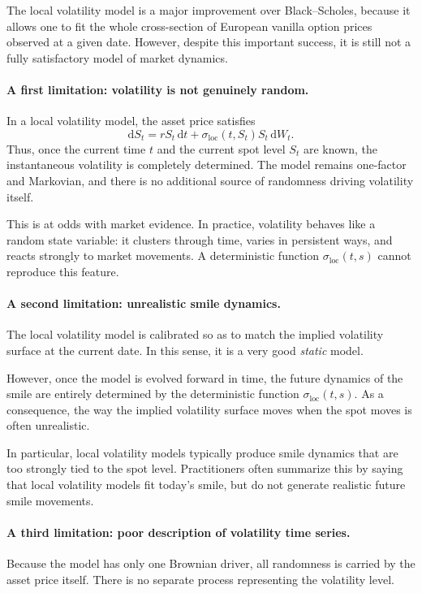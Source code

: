 \documentclass[11pt]{article}
\theoremstyle{plain}
\theoremstyle{definition}
\theoremstyle{remark}
\begin{document}
The local volatility model is a major improvement over Black--Scholes,
because it allows one to fit the whole cross-section of European vanilla
option prices observed at a given date.
However, despite this important success, it is still not a fully
satisfactory model of market dynamics.

\paragraph{A first limitation: volatility is not genuinely random.}
In a local volatility model, the asset price satisfies
\[
\mathrm{d}S_t
=
rS_t\,\mathrm{d}t
+
\sigma_{\mathrm{loc}}(t,S_t)S_t\,\mathrm{d}W_t.
\]
Thus, once the current time \(t\) and the current spot level \(S_t\) are
known, the instantaneous volatility is completely determined.
The model remains one-factor and Markovian, and there is no additional
source of randomness driving volatility itself.

This is at odds with market evidence.
In practice, volatility behaves like a random state variable:
it clusters through time, varies in persistent ways, and reacts
strongly to market movements.
A deterministic function \(\sigma_{\mathrm{loc}}(t,s)\) cannot reproduce
this feature.

\paragraph{A second limitation: unrealistic smile dynamics.}
The local volatility model is calibrated so as to match the implied
volatility surface at the current date.
In this sense, it is a very good \emph{static} model.

However, once the model is evolved forward in time, the future
dynamics of the smile are entirely determined by the deterministic
function \(\sigma_{\mathrm{loc}}(t,s)\).
As a consequence, the way the implied volatility surface moves when the
spot moves is often unrealistic.

In particular, local volatility models typically produce smile dynamics
that are too strongly tied to the spot level.
Practitioners often summarize this by saying that local volatility
models fit today's smile, but do not generate realistic future smile
movements.

\paragraph{A third limitation: poor description of volatility time series.}
Because the model has only one Brownian driver, all randomness is carried
by the asset price itself.
There is no separate process representing the volatility level.
\end{document}
